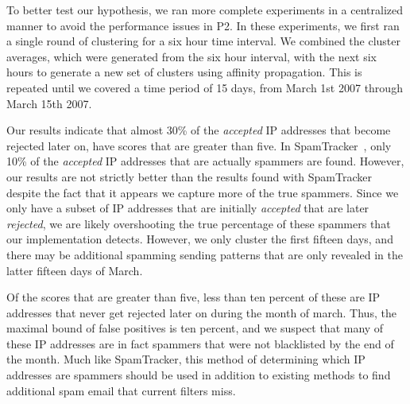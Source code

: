 To better test our hypothesis, we ran more complete experiments in a centralized manner to avoid the performance issues in P2. In these experiments, we first ran a single round of clustering for a six hour time interval. We combined the cluster averages, which were generated from the six hour interval, with the next six hours to generate a new set of clusters using affinity propagation. This is repeated until we covered a time period of 15 days, from March 1st 2007 through March 15th 2007. 

Our results indicate that almost 30\% of the \emph{accepted} IP addresses that become rejected later on, have scores that are greater than five. In SpamTracker~\cite{bb}, only 10\% of the \emph{accepted} IP addresses that are actually spammers are found. However, our results are not strictly better than the results found with SpamTracker~\cite{bb} despite the fact that it appears we capture more of the true spammers. Since we only have a subset of IP addresses that are initially \emph{accepted} that are later \emph{rejected}, we are likely overshooting the true percentage of these spammers that our implementation detects. However, we only cluster the first fifteen days, and there may be additional spamming sending patterns that are only revealed in the latter fifteen days of March. 

Of the scores that are greater than five, less than ten percent of these are IP addresses that never get rejected later on during the month of march. Thus, the maximal bound of false positives is ten percent, and we suspect that many of these IP addresses are in fact spammers that were not blacklisted by the end of the month. Much like SpamTracker, this method of determining which IP addresses are spammers should be used in addition to existing methods to find additional spam email that current filters miss. 
